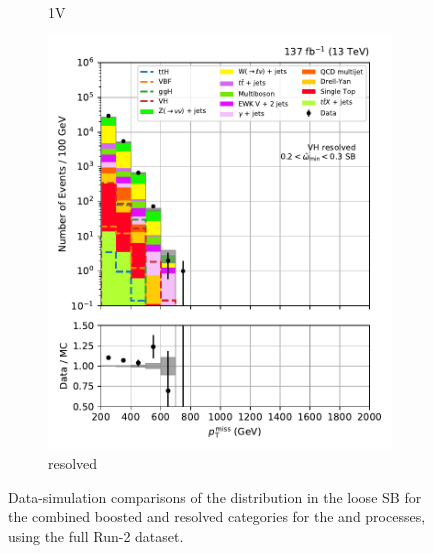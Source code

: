 \begin{figure}[htbp]
\begin{subfigure}[b]{0.24\textwidth}
        \caption{\VH 1V}
    \end{subfigure}
    \hfill
    \begin{subfigure}[b]{0.24\textwidth}
        \includegraphics[width=\textwidth]{figures/region_plots/full_Run2/sideband_4/VH_resolved.pdf}
        \caption{\VH resolved}
    \end{subfigure}
    \caption[Data-simulation comparisons of the \ptmiss distribution in the loose \omegaTilde sideband for the combined boosted and resolved categories for the \ttH and \VH processes, using the full Run-2 dataset]{Data-simulation comparisons of the \ptmiss distribution in the loose \omegaTilde \gls{SB} for the combined boosted and resolved categories for the \ttH and \VH processes, using the full Run-2 dataset.}
    \label{fig:htoinv_sb_yields_comb2016to18_loose_minOmegaTilde}
\end{figure}

